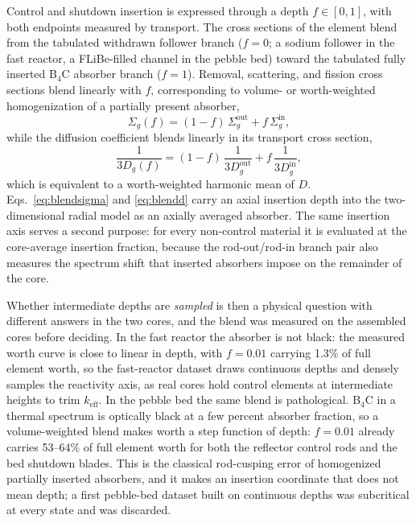 \documentclass[preprint,12pt]{elsarticle}
\newcommand{\keff}{k_{\mathrm{eff}}}
\begin{document}
Control and shutdown insertion is expressed through a depth $f\in[0,1]$, with
both endpoints measured by transport. The cross sections of the element blend
from the tabulated withdrawn follower branch ($f=0$; a sodium follower in the
fast reactor, a FLiBe-filled channel in the pebble bed) toward the tabulated
fully inserted B$_4$C absorber branch ($f=1$). Removal, scattering, and fission
cross sections blend linearly with $f$, corresponding to volume- or
worth-weighted homogenization of a partially present absorber,
\begin{equation}
\Sigma_g(f) = (1-f)\,\Sigma_g^{\mathrm{out}} + f\,\Sigma_g^{\mathrm{in}},
\label{eq:blendsigma}
\end{equation}
while the diffusion coefficient blends linearly in its transport cross section,
\begin{equation}
\frac{1}{3D_g(f)} = (1-f)\,\frac{1}{3D_g^{\mathrm{out}}} + f\,\frac{1}{3D_g^{\mathrm{in}}},
\label{eq:blendd}
\end{equation}
which is equivalent to a worth-weighted harmonic mean of $D$. Eqs.~\eqref{eq:blendsigma}
and \eqref{eq:blendd} carry an axial insertion depth into the two-dimensional
radial model as an axially averaged absorber. The same insertion axis serves a
second purpose: for every non-control material it is evaluated at the
core-average insertion fraction, because the rod-out/rod-in branch pair also
measures the spectrum shift that inserted absorbers impose on the remainder of
the core.

Whether intermediate depths are \emph{sampled} is then a physical question with
different answers in the two cores, and the blend was measured on the assembled
cores before deciding. In the fast reactor the absorber is not black: the
measured worth curve is close to linear in depth, with $f=0.01$ carrying 1.3\% of
full element worth, so the fast-reactor dataset draws continuous depths and
densely samples the reactivity axis, as real cores hold control elements at
intermediate heights to trim $\keff$. In the pebble bed the same blend is
pathological. B$_4$C in a thermal spectrum is optically black at a few percent
absorber fraction, so a volume-weighted blend makes worth a step function of
depth: $f=0.01$ already carries 53--64\% of full element worth for both the
reflector control rods and the bed shutdown blades. This is the classical
rod-cusping error of homogenized partially inserted absorbers, and it makes an
insertion coordinate that does not mean depth; a first pebble-bed dataset built
on continuous depths was subcritical at every state and was discarded.
\end{document}
